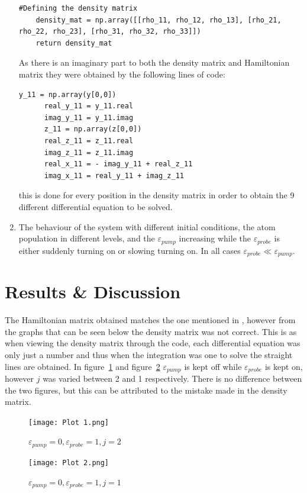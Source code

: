 \documentclass[12pt, a4paper]{article}
\begin{document}
\begin{enumerate}
\begin{lstlisting}[language=iPython]
    #Defining the density matrix
    density_mat = np.array([[rho_11, rho_12, rho_13], [rho_21, rho_22, rho_23], [rho_31, rho_32, rho_33]])
    return density_mat
    \end{lstlisting}
    As there is an imaginary part to both the density matrix and Hamiltonian matrix they were obtained by the following lines of code:
    \begin{lstlisting}[language=iPython]
      y_11 = np.array(y[0,0])
      real_y_11 = y_11.real
      imag_y_11 = y_11.imag
      z_11 = np.array(z[0,0])
      real_z_11 = z_11.real
      imag_z_11 = z_11.imag
      real_x_11 = - imag_y_11 + real_z_11
      imag_x_11 = real_y_11 + imag_z_11
    \end{lstlisting}
    this is done for every position in the density matrix in order to obtain the 9 different differential equation to be solved.

    \item The behaviour of the system with different initial conditions, the atom population in different levels, and the \(\varepsilon_{pump}\) increasing while the \(\varepsilon_{probe}\) is either suddenly turning on or slowing turning on. In all cases \(\varepsilon_{probe} \ll \varepsilon_{pump}\).
  \end{enumerate}

\section{Results \& Discussion}
The Hamiltonian matrix obtained matches the one mentioned in \cite{erickson}, however from the graphs that can be seen below the density matrix was not correct. This is as when viewing the density matrix through the code, each differential equation was only just a number and thus when the integration was one to solve the straight lines are obtained. In figure~\ref{fig:fig1} and figure~\ref{fig:fig2} \(\varepsilon_{pump}\) is kept off while \(\varepsilon_{probe}\) is kept on, however \(j\) was varied between 2 and 1 respectively. There is no difference between the two figures, but this can be attributed to the mistake made in the density matrix.

\begin{figure}[H]
  \centering
  \texttt{[image: Plot 1.png]}\caption{\(\varepsilon_{pump} = 0, \varepsilon_{probe}= 1, j=2\)}\label{fig:fig1}
\end{figure}

\begin{figure}[H]
  \centering
  \texttt{[image: Plot 2.png]}\caption{\(\varepsilon_{pump} = 0, \varepsilon_{probe}= 1, j=1\)}\label{fig:fig2}
\end{figure}
\end{document}
